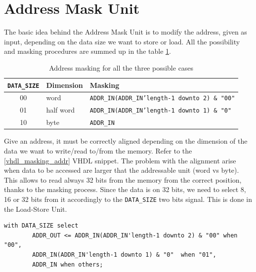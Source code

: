 \section{Address Mask Unit}
The basic idea behind the Address Mask Unit is to modify the address, given as input, depending on the data size we want to store or load. All the possibility and masking procedures are summed up in the table \ref{tab:addr_masking}. 

\begin{table}[ht]
	\begin{center}
		\begin{tabular}{ c| l | l}
			\texttt{DATA\_SIZE} & \textbf{Dimension} & \textbf{Masking}\\
			\hline
			00 & word & \texttt{ADDR\_IN(ADDR\_IN'length-1 downto 2) \& "00"}\\
			01 & half word & \texttt{ADDR\_IN(ADDR\_IN'length-1 downto 1) \& "0"} \\
			10 & byte & \texttt{ADDR\_IN}
			
		\end{tabular}
		\caption{Address masking for all the three possible cases}
		\label{tab:addr_masking}
	\end{center}
\end{table}


Give an address, it must be correctly aligned depending on the dimension of the data we want to write/read to/from the memory. Refer to the \ref{vhdl_masking_addr} VHDL snippet. The problem with the alignment arise when data to be accessed are larger that the addressable unit (word vs byte). This allows to read always 32 bits from the memory from the correct position, thanks to the masking process. Since the data is on 32 bits, we need to select 8, 16 or 32 bits from it accordingly to the \texttt{DATA\_SIZE} two bits signal. This is done in the Load-Store Unit.

\hfill
\begin{lstlisting}[style=vhdl,caption={VHDL code for address alignment},label=vhdl_masking_addr]
	with DATA_SIZE select
		ADDR_OUT <= ADDR_IN(ADDR_IN'length-1 downto 2) & "00" when "00",
		ADDR_IN(ADDR_IN'length-1 downto 1) & "0"  when "01",
		ADDR_IN when others;
\end{lstlisting}

